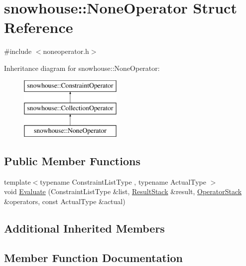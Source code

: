 \hypertarget{structsnowhouse_1_1NoneOperator}{}\section{snowhouse\+::None\+Operator Struct Reference}
\label{structsnowhouse_1_1NoneOperator}


{\ttfamily \#include $<$noneoperator.\+h$>$}

Inheritance diagram for snowhouse\+::None\+Operator\+:\begin{figure}[H]
\begin{center}
\leavevmode
\includegraphics[height=3.000000cm]{structsnowhouse_1_1NoneOperator}
\end{center}
\end{figure}
\subsection*{Public Member Functions}
\begin{DoxyCompactItemize}
\item 
{\footnotesize template$<$typename Constraint\+List\+Type , typename Actual\+Type $>$ }\\void \mbox{\hyperlink{structsnowhouse_1_1NoneOperator_a1f4585fea737cb36bb18bbca99ac018b}{Evaluate}} (Constraint\+List\+Type \&list, \mbox{\hyperlink{namespacesnowhouse_a719169b1315a13161c15f25e600a8f51}{Result\+Stack}} \&result, \mbox{\hyperlink{namespacesnowhouse_adcb10e215e6a4bbcb35722a9c7270fc6}{Operator\+Stack}} \&operators, const Actual\+Type \&actual)
\end{DoxyCompactItemize}
\subsection*{Additional Inherited Members}


\subsection{Member Function Documentation}
\mbox{\label{structsnowhouse_1_1NoneOperator_a1f4585fea737cb36bb18bbca99ac018b}} 
